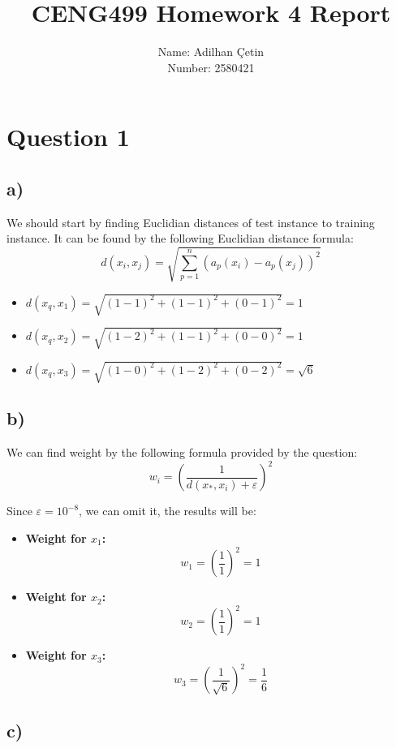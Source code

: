 \documentclass[12pt,a4paper]{article}
\title{CENG499 Homework 4 Report}
\author{Name: Adilhan Çetin \\ Number: 2580421}
\begin{document}
\maketitle

\section*{Question 1}

\subsection*{a)}

We should start by finding Euclidian distances of test instance to training instance. It can be found by the following Euclidian distance formula:
$$d(x_{i},x_{j})=\sqrt{\sum_{p=1}^{n}(a_{p}(x_{i})-a_{p}(x_{j}))^{2}}$$

\begin{itemize}
    \item $d(x_q, x_1) = \sqrt{(1-1)^2 + (1-1)^2 + (0-1)^2} = 1$
    \item $d(x_q, x_2) = \sqrt{(1-2)^2 + (1-1)^2 + (0-0)^2} = 1$
    \item $d(x_q, x_3) = \sqrt{(1-0)^2 + (1-2)^2 + (0-2)^2} = \sqrt{6}$
\end{itemize}


\subsection*{b)}

We can find weight by the following formula provided by the question:
$$w_i = \left( \frac{1}{d(x_*, x_i) + \varepsilon} \right)^2$$

Since $\varepsilon = 10^{-8}$, we can omit it, the results will be:

\begin{itemize}
    \item \textbf{Weight for $x_1$:}
    $$w_1 = \left( \frac{1}{1} \right)^2 = 1$$

    \item \textbf{Weight for $x_2$:}
    $$w_2 = \left( \frac{1}{1} \right)^2 = 1$$

    \item \textbf{Weight for $x_3$:}
    $$w_3 = \left( \frac{1}{\sqrt{6}} \right)^2 = \frac{1}{6}$$
\end{itemize}

\subsection*{c)}
\end{document}
